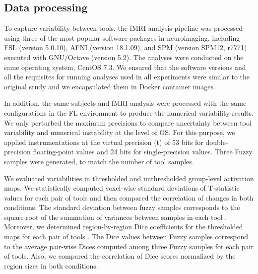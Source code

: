 \documentclass[conference]{IEEEtran}
\begin{document}
\subsection{Data processing}

To capture variability between tools, the fMRI analysis pipeline was processed using three of the most popular software
packages in neuroimaging, including FSL (version 5.0.10), AFNI (version 18.1.09), and SPM (version SPM12, r7771)
executed with GNU/Octave (version 5.2). The analyses were conducted on the same operating system, CentOS 7.3.
We ensured that the software versions and all the requisites  for running analyses used in all experiments 
were similar to the original study and we encapsulated them in Docker container images.

In addition, the same subjects and fMRI analysis were processed with the same configurations in the FL environment
to produce the numerical variability results.
We only perturbed the maximum precisions  to compare uncertainty between tool variability and numerical instability at the level of OS.
For this purpose, we applied instrumentations at the virtual precision (t) of 53 bits for double-precision floating-point values
and 24 bits for  single-precision values. Three Fuzzy samples were generated, to match the number of tool samples.

We evaluated variabilities  in thresholded and unthresholded group-level activation maps.
We statistically computed  voxel-wise standard deviations  of T-statistic values for each pair of tools
and then compared the correlation of changes  in both conditions.
The standard deviation between fuzzy samples corresponds to the square root of the summation of variances between samples in each tool .
Moreover, we determined region-by-region Dice coefficients for the thresholded maps for each pair of tools .
The Dice values between Fuzzy samples correspond to the average pair-wise Dices computed among three Fuzzy samples
for each pair of tools.
Also, we compared the correlation of Dice scores normalized by the region sizes in both conditions.
\end{document}
